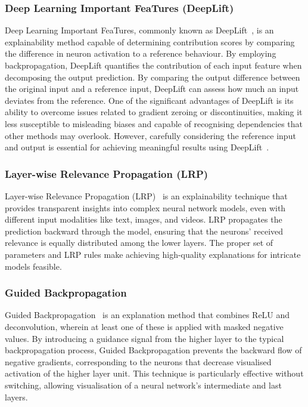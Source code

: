 \documentclass[dvipsnames]{article}
\renewcommand{\cite}[1]{\autocite{#1}}
\begin{document}
\subsubsection{Deep Learning Important FeaTures (DeepLift)}

Deep Learning Important FeaTures, commonly known as DeepLift~\cite{shrikumar2017learning}, is an explainability method capable of determining contribution scores by comparing the difference in neuron activation to a reference behaviour. By employing backpropagation, DeepLift quantifies the contribution of each input feature when decomposing the output prediction. By comparing the output difference between the original input and a reference input, DeepLift can assess how much an input deviates from the reference. One of the significant advantages of DeepLift is its ability to overcome issues related to gradient zeroing or discontinuities, making it less susceptible to misleading biases and capable of recognising dependencies that other methods may overlook. However, carefully considering the reference input and output is essential for achieving meaningful results using DeepLift~\cite{shrikumar2017learning}.

\subsubsection{Layer-wise Relevance Propagation (LRP)}

Layer-wise Relevance Propagation (LRP)~\cite{pone-lrp} is an explainability technique that provides transparent insights into complex neural network models, even with different input modalities like text, images, and videos. LRP propagates the prediction backward through the model, ensuring that the neurons' received relevance is equally distributed among the lower layers. The proper set of parameters and LRP rules make achieving high-quality explanations for intricate models feasible.


\subsubsection{Guided Backpropagation}

Guided Backpropagation~\cite{Guided_Backpropagation} is an explanation method that combines ReLU and deconvolution, wherein at least one of these is applied with masked negative values. By introducing a guidance signal from the higher layer to the typical backpropagation process, Guided Backpropagation prevents the backward flow of negative gradients, corresponding to the neurons that decrease visualised activation of the higher layer unit. This technique is particularly effective without switching, allowing visualisation of a neural network's intermediate and last layers.
\end{document}
